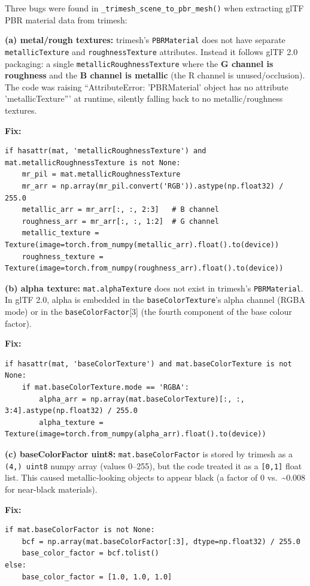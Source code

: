 Three bugs were found in \texttt{\_trimesh\_scene\_to\_pbr\_mesh()} when extracting glTF PBR material data from trimesh:

\textbf{(a) metal/rough textures:} trimesh's \texttt{PBRMaterial} does not have separate \texttt{metallicTexture} and \texttt{roughnessTexture} attributes. Instead it follows glTF 2.0 packaging: a single \texttt{metallicRoughnessTexture} where the \textbf{G channel is roughness} and the \textbf{B channel is metallic} (the R channel is unused/occlusion). The code was raising ``AttributeError: 'PBRMaterial' object has no attribute 'metallicTexture''' at runtime, silently falling back to no metallic/roughness textures.

\textbf{Fix:}
\begin{lstlisting}
if hasattr(mat, 'metallicRoughnessTexture') and mat.metallicRoughnessTexture is not None:
    mr_pil = mat.metallicRoughnessTexture
    mr_arr = np.array(mr_pil.convert('RGB')).astype(np.float32) / 255.0
    metallic_arr = mr_arr[:, :, 2:3]   # B channel
    roughness_arr = mr_arr[:, :, 1:2]  # G channel
    metallic_texture = Texture(image=torch.from_numpy(metallic_arr).float().to(device))
    roughness_texture = Texture(image=torch.from_numpy(roughness_arr).float().to(device))
\end{lstlisting}

\textbf{(b) alpha texture:} \texttt{mat.alphaTexture} does not exist in trimesh's \texttt{PBRMaterial}. In glTF 2.0, alpha is embedded in the \texttt{baseColorTexture}'s alpha channel (RGBA mode) or in the \texttt{baseColorFactor}[3] (the fourth component of the base colour factor).

\textbf{Fix:}
\begin{lstlisting}
if hasattr(mat, 'baseColorTexture') and mat.baseColorTexture is not None:
    if mat.baseColorTexture.mode == 'RGBA':
        alpha_arr = np.array(mat.baseColorTexture)[:, :, 3:4].astype(np.float32) / 255.0
        alpha_texture = Texture(image=torch.from_numpy(alpha_arr).float().to(device))
\end{lstlisting}

\textbf{(c) baseColorFactor uint8:} \texttt{mat.baseColorFactor} is stored by trimesh as a \texttt{(4,) uint8} numpy array (values 0--255), but the code treated it as a \texttt{[0,1]} float list. This caused metallic-looking objects to appear black (a factor of 0 vs.\ \textasciitilde{}0.008 for near-black materials).

\textbf{Fix:}
\begin{lstlisting}
if mat.baseColorFactor is not None:
    bcf = np.array(mat.baseColorFactor[:3], dtype=np.float32) / 255.0
    base_color_factor = bcf.tolist()
else:
    base_color_factor = [1.0, 1.0, 1.0]
\end{lstlisting}


